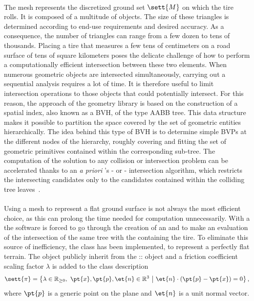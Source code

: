 \paragraph*{\Mesh{}}
The mesh represents the discretized ground set $\sett{M}$ on which the tire rolls. It is composed of a multitude of \TriangleGround{} objects. The size of these triangles is determined according to end-use requirements and desired accuracy. As a consequence, the number of triangles can range from a few dozen to tens of thousands. Placing a tire that measures a few tens of centimeters on a road surface of tens of square kilometers poses the delicate challenge of how to perform a computationally efficient intersection between these two elements. When numerous geometric objects are intersected simultaneously, carrying out a sequential analysis requires a lot of time. It is therefore useful to limit intersection operations to those objects that could potentially intersect. For this reason, the approach of the geometry library \Acme{} is based on the construction of a spatial index, also known as a \ac{BVH}, of the type \ac{AABB} tree. This data structure makes it possible to partition the space covered by the set of geometric entities hierarchically. The idea behind this type of \ac{BVH} is to determine simple \acp{BVP} at the different nodes of the hierarchy, roughly covering and fitting the set of geometric primitives contained within the corresponding sub-tree. The computation of the solution to any collision or intersection problem can be accelerated thanks to an \emph{a priori} \Acme{}'s \Aabb{}-\AabbTree{} or \AabbTree{}-\AabbTree{} intersection algorithm, which restricts the intersecting candidates only to the candidates contained within the colliding tree leaves~\cite{stocco2021acme}.

\paragraph*{\Flat{}}
Using a mesh to represent a flat ground surface is not always the most efficient choice, as this can prolong the time needed for computation unnecessarily. With a \Mesh{} the software is forced to go through the creation of an \AabbTree{} and to make an evaluation of the intersection of the same tree with the \Aabb{} containing the tire. To eliminate this source of inefficiency, the \Flat{} class has been implemented, to represent a perfectly flat terrain. The \Flat{} object publicly inherit from the \Acme{}::\Plane{} object and a friction coefficient scaling factor $\lambda$ is added to the class description
%
\begin{equation*}
  \sett{\pi} = \big\{ \lambda \in \mathbb{R}_{\geq 0}, ~ \pt{x},\pt{p},\et{n} \in \mathbb{R}^3 ~ \big\lvert ~ \et{n} \cdot (\pt{p} - \pt{x}) = 0\big\}
  \,\text{,}
\end{equation*}
%
where $\pt{p}$ is a generic point on the plane and $\et{n}$ is a unit normal vector.

